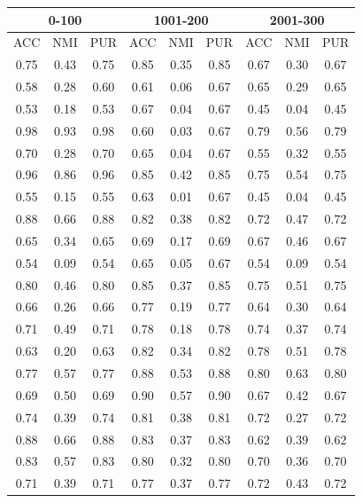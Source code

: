 \documentclass[10pt,final]{IEEEtran}
\begin{document}
\begin{center}
\begin{table}[h!]
\begin{tabular}{|c|c|c|c|c|c|c|c|c|}
    \hline
    \multicolumn{3}{|c|}{0-100} & \multicolumn{3}{|c|}{1001-200} & \multicolumn{3}{|c|}{2001-300}\\
    \hline
    ACC & NMI & PUR & ACC & NMI & PUR & ACC & NMI & PUR\\
    \hline
    0.75 & 0.43 & 0.75 & 0.85 & 0.35 & 0.85 & 0.67 & 0.30 & 0.67\\
    0.58 & 0.28 & 0.60 & 0.61 & 0.06 & 0.67 & 0.65 & 0.29 & 0.65\\
    0.53 & 0.18 & 0.53 & 0.67 & 0.04 & 0.67 & 0.45 & 0.04 & 0.45\\
    0.98 & 0.93 & 0.98 & 0.60 & 0.03 & 0.67 & 0.79 & 0.56 & 0.79\\
    0.70 & 0.28 & 0.70 & 0.65 & 0.04 & 0.67 & 0.55 & 0.32 & 0.55\\
    0.96 & 0.86 & 0.96 & 0.85 & 0.42 & 0.85 & 0.75 & 0.54 & 0.75\\
    0.55 & 0.15 & 0.55 & 0.63 & 0.01 & 0.67 & 0.45 & 0.04 & 0.45\\
    0.88 & 0.66 & 0.88 & 0.82 & 0.38 & 0.82 & 0.72 & 0.47 & 0.72\\
    0.65 & 0.34 & 0.65 & 0.69 & 0.17 & 0.69 & 0.67 & 0.46 & 0.67\\
    0.54 & 0.09 & 0.54 & 0.65 & 0.05 & 0.67 & 0.54 & 0.09 & 0.54\\
    0.80 & 0.46 & 0.80 & 0.85 & 0.37 & 0.85 & 0.75 & 0.51 & 0.75\\
    0.66 & 0.26 & 0.66 & 0.77 & 0.19 & 0.77 & 0.64 & 0.30 & 0.64\\
    0.71 & 0.49 & 0.71 & 0.78 & 0.18 & 0.78 & 0.74 & 0.37 & 0.74\\
    0.63 & 0.20 & 0.63 & 0.82 & 0.34 & 0.82 & 0.78 & 0.51 & 0.78\\
    0.77 & 0.57 & 0.77 & 0.88 & 0.53 & 0.88 & 0.80 & 0.63 & 0.80\\
    0.69 & 0.50 & 0.69 & 0.90 & 0.57 & 0.90 & 0.67 & 0.42 & 0.67\\
    0.74 & 0.39 & 0.74 & 0.81 & 0.38 & 0.81 & 0.72 & 0.27 & 0.72\\
    0.88 & 0.66 & 0.88 & 0.83 & 0.37 & 0.83 & 0.62 & 0.39 & 0.62\\
    0.83 & 0.57 & 0.83 & 0.80 & 0.32 & 0.80 & 0.70 & 0.36 & 0.70\\
    0.71 & 0.39 & 0.71 & 0.77 & 0.37 & 0.77 & 0.72 & 0.43 & 0.72\\

\end{tabular}
\end{table}
\end{center}
\end{document}
